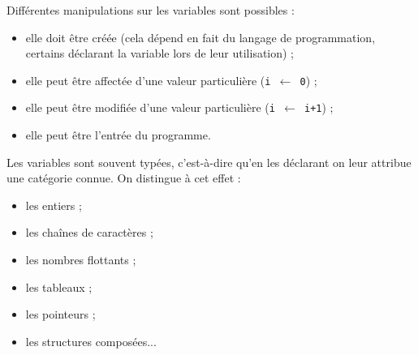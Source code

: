 Différentes manipulations sur les variables sont possibles :
\begin{itemize}
\item elle doit être créée (cela dépend en fait du langage de programmation, certains déclarant la variable lors de leur utilisation) ;
\item elle peut être affectée d'une valeur particulière (\texttt{i $\leftarrow$ 0}) ;
\item elle peut être modifiée d'une valeur particulière (\texttt{i $\leftarrow$ i+1}) ;
\item elle peut être l'entrée du programme.
\end{itemize}

Les variables sont souvent typées, c'est-à-dire qu'en les déclarant on leur attribue une catégorie connue. On distingue à cet effet :

\begin{multicols}{2}
\begin{itemize}
\item les entiers ;
\item les chaînes de caractères ;
\item les nombres flottants ;
\item les tableaux ;
\item les pointeurs ;
\item les structures composées...
\end{itemize}
\end{multicols}

